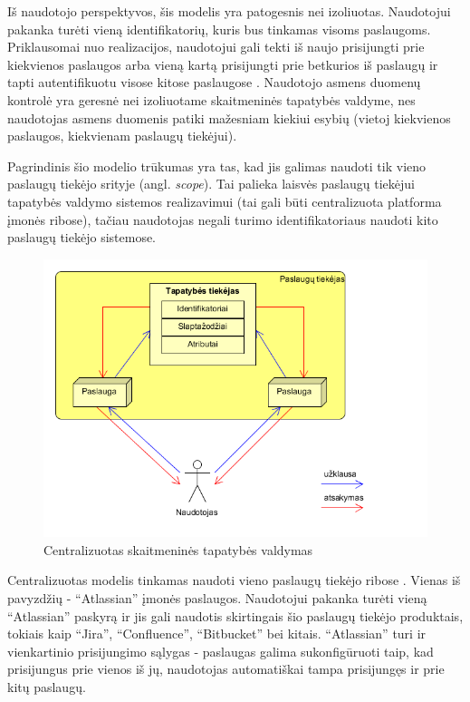 Iš naudotojo perspektyvos, šis modelis yra patogesnis nei izoliuotas. Naudotojui pakanka turėti vieną identifikatorių,
kuris bus tinkamas visoms paslaugoms. Priklausomai nuo realizacijos, naudotojui gali tekti iš naujo prisijungti prie kiekvienos
paslaugos arba vieną kartą prisijungti prie betkurios iš paslaugų ir tapti autentifikuotu visose kitose paslaugose \cite{Josang2005}. Naudotojo asmens
duomenų kontrolė yra geresnė nei izoliuotame skaitmeninės tapatybės valdyme, nes naudotojas asmens duomenis patiki mažesniam kiekiui esybių
(vietoj kiekvienos paslaugos, kiekvienam paslaugų tiekėjui).

Pagrindinis šio modelio trūkumas yra tas, kad jis galimas naudoti tik vieno paslaugų tiekėjo srityje (angl. \textit{scope}). Tai palieka laisvės paslaugų tiekėjui tapatybės valdymo sistemos
realizavimui (tai gali būti centralizuota platforma įmonės ribose), tačiau naudotojas negali turimo identifikatoriaus
naudoti kito paslaugų tiekėjo sistemose.

\begin{figure}[H]
    \centering
    \includegraphics[scale=0.8]{img/centralizedModel}
    \caption{Centralizuotas skaitmeninės tapatybės valdymas \cite{Cao2010}}
    \label{fig:isolatedModel}
\end{figure}


Centralizuotas modelis tinkamas naudoti vieno paslaugų tiekėjo ribose \cite{Josang2005}. Vienas iš pavyzdžių - 
\enquote{Atlassian} įmonės paslaugos. Naudotojui pakanka turėti vieną \enquote{Atlassian} paskyrą ir jis gali naudotis
skirtingais šio paslaugų tiekėjo produktais, tokiais kaip \enquote{Jira}, \enquote{Confluence}, \enquote{Bitbucket} bei kitais. \enquote{Atlassian}
turi ir vienkartinio prisijungimo sąlygas - paslaugas galima sukonfigūruoti taip, kad prisijungus prie vienos iš jų,
naudotojas automatiškai tampa prisijungęs ir prie kitų paslaugų.

